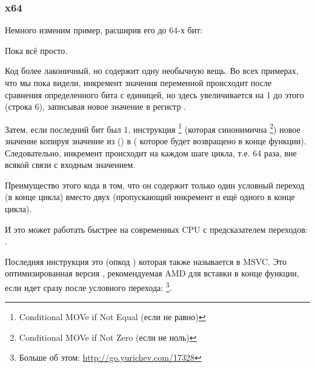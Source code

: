 \subsubsection{x64}
\label{subsec:popcnt}

Немного изменим пример, расширив его до 64-х бит:




Пока всё просто.






Код более лаконичный, но содержит одну необычную вещь.
Во всех примерах, что мы пока видели, инкремент значения переменной  происходит после сравнения 
определенного бита с единицей, но здесь  увеличивается на 1 до этого (строка 6), записывая новое значение
в регистр \EDX.

Затем, если последний бит был 1, инструкция \CMOVNE\footnote{Conditional MOVe if Not Equal (\MOV если не равно)}
(которая синонимична \CMOVNZ\footnote{Conditional MOVe if Not Zero (\MOV если не ноль)})  
новое значение 
копируя значение из \EDX () 
в \EAX ( которое будет возвращено в конце функции).
Следовательно, инкремент происходит на каждом шаге цикла, т.е. 64 раза, вне всякой связи с входным
значением.

Преимущество этого кода в том, что он содержит только один условный переход (в конце цикла) вместо
двух (пропускающий инкремент  и ещё одного в конце цикла).

И это может работать быстрее на современных CPU с предсказателем переходов: .

\label{FATRET}
Последняя инструкция это  (опкод ) 
которая также называется  в MSVC.
Это оптимизированная версия \RET, рекомендуемая AMD для вставки в конце функции, если \RET идет
сразу после условного перехода: 
\footnote{Больше об этом: \url{http://go.yurichev.com/17328}}.

